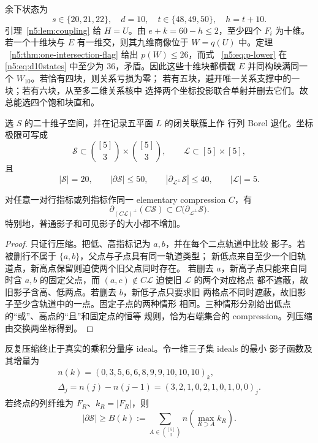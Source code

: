 余下状态为
\begin{equation}\label{n5:eq:d10states}
 s\in\{20,21,22\},\quad d=10,\quad
 t\in\{48,49,50\},\quad h=t+10.
\end{equation}
引理~\ref{n5:lem:coupling} 给 \(H=U\)。由
\(e+k=60-h\le2\)，至少四个 \(F_i\) 为十维。若一个十维块与 \(E\)
有一维交，则其九维商像位于 \(W=q(U)\) 中。定理
~\ref{n5:thm:one-intersection-flag} 给出 \(p(W)\le26\)，而式
~\eqref{n5:eq:p-lower} 在
\eqref{n5:eq:d10states} 中至少为 36，矛盾。因此这些十维块都横截
\(E\) 并同构映满同一个 \(W_{10}\)。若恰有四块，则关系亏损为零；
若有五块，避开唯一关系支撑中的一块；若有六块，从至多二维关系核中
选择两个坐标投影联合单射并删去它们。故总能选四个饱和块直和。

选 \(S\) 的二十维子空间，并在记录五平面 \(L\) 的闭关联簇上作
行列 Borel 退化。坐标极限可写成
\[
 \mathcal S\subset\binom{[5]}3\times\binom{[5]}3,\qquad
 \mathcal L\subset[5]\times[5],
\]
且
\begin{equation}\label{n5:eq:flagbounds}
 |\mathcal S|=20,\qquad |\partial\mathcal S|\le50,\qquad
 |\partial_{\mathcal L^\perp}\mathcal S|\le40,\qquad|\mathcal L|=5.
\end{equation}

\begin{lemma}\label{n5:lem:simshift}
对任意一对行指标或列指标作同一 elementary compression \(C\)，有
\[
 \partial_{(C\mathcal L)^\perp}(C\mathcal S)
 \subset C\bigl(\partial_{\mathcal L^\perp}\mathcal S\bigr).
\]
特别地，普通影子和可见影子的大小都不增加。
\end{lemma}

\begin{proof}
只证行压缩。把低、高指标记为 \(a,b\)，并在每个二点轨道中比较
影子。若被删行不属于 \(\{a,b\}\)，父点与子点具有同一轨道类型；
新低点来自至少一个旧轨道点，新高点保留则迫使两个旧父点同时存在。
若删去 \(a\)，新高子点只能来自同时含 \(a,b\) 的固定父点，而
\((a,c)\notin C\mathcal L\) 迫使旧 \(\mathcal L\) 的两个对应格点
都不遮蔽，故旧影子含高、低两点。若删去 \(b\)，新低子点只要求旧
两格点不同时遮蔽，故旧影子至少含轨道中的一点。固定子点的两种情形
相同。三种情形分别给出低点的“或”、高点的“且”和固定点的恒等
规则，恰为右端集合的 compression。列压缩由交换两坐标得到。
\end{proof}

反复压缩终止于真实的乘积分量序 ideal。令一维三子集 ideals 的最小
影子函数及其增量为
\[
\begin{gathered}
 n(k)=(0,3,5,6,6,8,9,9,10,10,10)_k,\\
 \Delta_j=n(j)-n(j-1)=(3,2,1,0,2,1,0,1,0,0)_j.
\end{gathered}                                             \tag{*}
\]
若终点的列纤维为 \(F_R\)、\(k_R=|F_R|\)，则
\[
 |\partial\mathcal S|\ge
 B(k):=\sum_{A\in\binom{[5]}2}
 n\!\left(\max_{R\supset A}k_R\right).                 \tag{**}
\]

